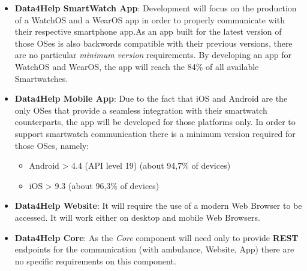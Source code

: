\begin{itemize}
    \item \textbf{Data4Help SmartWatch App}: Development will focus on the production of a WatchOS and a WearOS app in order to properly communicate with their respective smartphone app.\newline As an app built for the latest version of those OSes is also backwords compatible with their previous versions, there are no particular \textit{minimum version} requirements.
    By developing an app for WatchOS and WearOS, the app will reach the 84\% of all available Smartwatches.

    \item \textbf{Data4Help Mobile App}: Due to the fact that iOS and Android are the only OSes that provide a seamless integration with their smartwatch counterparts, the app will be developed for those platforms only.
    In order to support smartwatch communication there is a minimum version required for those OSes, namely:
    \begin{itemize}
        \item Android \textgreater \vspace{0.1cm} 4.4 (API level 19) (about 94,7\% of devices)
        \item iOS \textgreater \vspace{0.4cm} 9.3 (about 96,3\% of devices)

    \end{itemize}
    
    \item \textbf{Data4Help Website}: It will require the use of a modern Web Browser to be accessed. It will work either on desktop and mobile Web Browsers.
    
    \item \textbf{Data4Help Core}: As the \textit{Core} component will need only to provide \textbf{REST} endpoints for the communication (with ambulance, Website, App) there are no specific requirements on this component.
\end{itemize}
